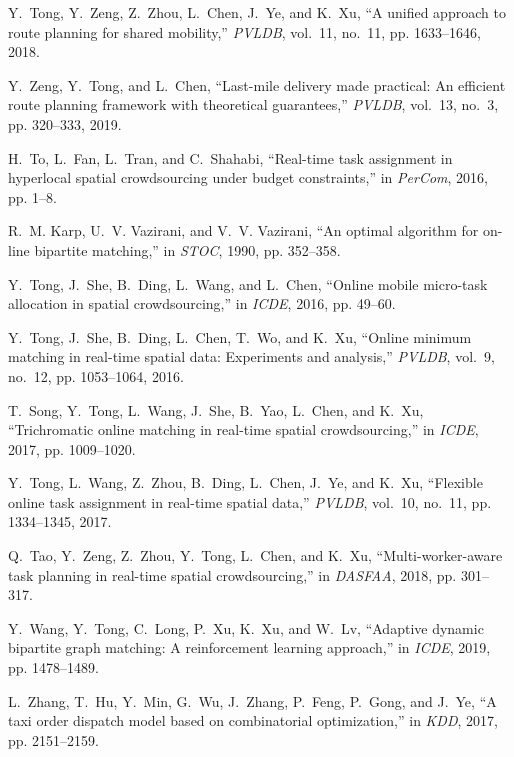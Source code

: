 \documentclass[11pt]{article}
\begin{document}
\begin{thebibliography}{10}
	Y.~Tong, Y.~Zeng, Z.~Zhou, L.~Chen, J.~Ye, and K.~Xu, ``A unified approach to
	route planning for shared mobility,'' \emph{{PVLDB}}, vol.~11, no.~11, pp.
	1633--1646, 2018.
	
	Y.~Zeng, Y.~Tong, and L.~Chen, ``Last-mile delivery made practical: An
	efficient route planning framework with theoretical guarantees,''
	\emph{{PVLDB}}, vol.~13, no.~3, pp. 320--333, 2019.
	
	H.~To, L.~Fan, L.~Tran, and C.~Shahabi, ``Real-time task assignment in
	hyperlocal spatial crowdsourcing under budget constraints,'' in
	\emph{PerCom}, 2016, pp. 1--8.
	
	R.~M. Karp, U.~V. Vazirani, and V.~V. Vazirani, ``An optimal algorithm for
	on-line bipartite matching,'' in \emph{STOC}, 1990, pp. 352--358.
	
	Y.~Tong, J.~She, B.~Ding, L.~Wang, and L.~Chen, ``Online mobile micro-task
	allocation in spatial crowdsourcing,'' in \emph{ICDE}, 2016, pp. 49--60.
	
	Y.~Tong, J.~She, B.~Ding, L.~Chen, T.~Wo, and K.~Xu, ``Online minimum matching
	in real-time spatial data: Experiments and analysis,'' \emph{{PVLDB}},
	vol.~9, no.~12, pp. 1053--1064, 2016.
	
	T.~Song, Y.~Tong, L.~Wang, J.~She, B.~Yao, L.~Chen, and K.~Xu, ``Trichromatic
	online matching in real-time spatial crowdsourcing,'' in \emph{ICDE}, 2017,
	pp. 1009--1020.
	
	Y.~Tong, L.~Wang, Z.~Zhou, B.~Ding, L.~Chen, J.~Ye, and K.~Xu, ``Flexible
	online task assignment in real-time spatial data,'' \emph{{PVLDB}}, vol.~10,
	no.~11, pp. 1334--1345, 2017.
	
	Q.~Tao, Y.~Zeng, Z.~Zhou, Y.~Tong, L.~Chen, and K.~Xu, ``Multi-worker-aware
	task planning in real-time spatial crowdsourcing,'' in \emph{DASFAA}, 2018,
	pp. 301--317.
	
	Y.~Wang, Y.~Tong, C.~Long, P.~Xu, K.~Xu, and W.~Lv, ``Adaptive dynamic
	bipartite graph matching: {A} reinforcement learning approach,'' in
	\emph{ICDE}, 2019, pp. 1478--1489.
	
	L.~Zhang, T.~Hu, Y.~Min, G.~Wu, J.~Zhang, P.~Feng, P.~Gong, and J.~Ye, ``A taxi
	order dispatch model based on combinatorial optimization,'' in \emph{KDD},
	2017, pp. 2151--2159.
	

\end{thebibliography}
\end{document}
